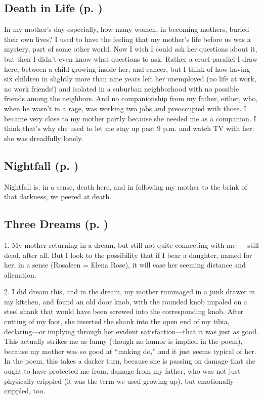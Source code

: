 \subsection{Death in Life (p. \pageref{ch:deathinlife})}
In my mother's day especially, how many women, in becoming mothers, buried their
own lives? I used to have the feeling that my mother's life before us was a
mystery, part of some other world. Now I wish I could ask her questions about
it, but then I didn't even know what questions to ask. Rather a cruel parallel I
draw here, between a child growing inside her, and cancer, but I think of how
having six children in slightly more than nine years left her unemployed (no
life at work, no work friends!) and isolated in a suburban neighborhood with no
possible friends among the neighbors. And no companionship from my father,
either, who, when he wasn't in a rage, was working two jobs and preoccupied with
those. I became very close to my mother partly because she needed me as a
companion. I think that's why she used to let me stay up past 9 p.m. and watch
TV with her: she was dreadfully lonely.

\subsection{Nightfall (p. \pageref{ch:nightfall})}
Nightfall is, in a sense, death here, and in following my mother to the brink of
that darkness, we peered at death.

\subsection{Three Dreams (p. \pageref{ch:threedreams})}
1. My mother returning in a dream, but still not quite connecting with me----
still dead, after all. But I look to the possibility that if I bear a daughter,
named for her, in a sense (Rosaleen = Elena Rose), it will ease her seeming
distance and alienation.

2. I did dream this, and in the dream, my mother rummaged in a junk drawer in my
kitchen, and found an old door knob, with the rounded knob impaled on a steel
shank that would have been screwed into the corresponding knob. After cutting of
my foot, she inserted the shank into the open end of my tibia, declaring---or
implying through her evident satisfaction---that it was just as good. This
actually strikes me as funny (though no humor is implied in the poem), because
my mother was so good at ``making do,'' and it just seems typical of her. In the
poem, this takes a darker turn, because she is passing on damage that she ought
to have protected me from, damage from my father, who was not just physically
crippled (it was the term we used growing up), but emotionally crippled, too.

